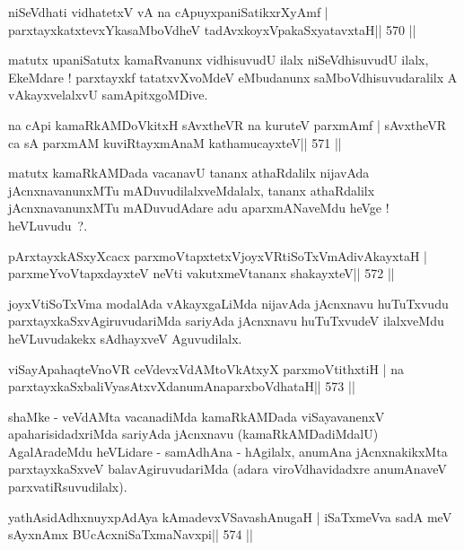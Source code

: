 \begin{shl}
niSeVdhati vidhatetxV vA na cApuyxpaniSatikxrXyAmf |
parxtayxkatxtevxYkasaMboVdheV tadAvxkoyxVpakaSxyatavxtaH\hfill || 570 ||
\end{shl}

\begin{artha}
matutx upaniSatutx kamaRvanunx vidhisuvudU ilalx niSeVdhisuvudU ilalx, EkeMdare ! parxtayxkf tatatxvXvoMdeV eMbudanunx saMboVdhisuvudaralilx A vAkayxvelalxvU samApitxgoMDive.
\end{artha}

\begin{shl}
na cApi kamaRkAMDoVkitxH sAvxtheVR na kuruteV parxmAmf |
sAvxtheVR ca sA parxmAM kuviRtayxmAnaM kathamucayxteV\hfill || 571 ||
\end{shl}

\begin{artha}
matutx kamaRkAMDada vacanavU tananx athaRdalilx nijavAda jAcnxnavanunxMTu mADuvudilalxveMdalalx, tananx athaRdalilx jAcnxnavanunxMTu mADuvudAdare adu aparxmANaveMdu heVge ! heVLuvudu~?.
\end{artha}

\begin{shl}
pArxtayxkASxyXcacx parxmoVtapxtetxVjoyxVRtiSoTxVmAdivAkayxtaH |
parxmeYvoVtapxdayxteV neVti vakutxmeVtananx shakayxteV\hfill || 572 ||
\end{shl}

\begin{artha}
joyxVtiSoTxVma modalAda vAkayxgaLiMda nijavAda jAcnxnavu huTuTxvudu parxtayxkaSxvAgiruvudariMda sariyAda jAcnxnavu huTuTxvudeV ilalxveMdu heVLuvudakekx sAdhayxveV Aguvudilalx.
\end{artha}

\begin{shl}
viSayApahaqteVnoVR ceVdevxVdAMtoVkAtxyX parxmoVtithxtiH |
na parxtayxkaSxbaliVyasAtxvXdanumAnaparxboVdhataH\hfill || 573 ||
\end{shl}

\begin{artha}
shaMke - veVdAMta vacanadiMda kamaRkAMDada viSayavanenxV apaharisidadxriMda sariyAda jAcnxnavu (kamaRkAMDadiMdalU) AgalAradeMdu heVLidare - samAdhAna - hAgilalx, anumAna jAcnxnakikxMta parxtayxkaSxveV balavAgiruvudariMda (adara viroVdhavidadxre anumAnaveV parxvatiRsuvudilalx).
\end{artha}



\begin{shl}
yathAsidAdhxnuyxpAdAya kAmadevxVSavashAnugaH |
iSaTxmeVva sadA meV sAyxnAmx BUcAcxniSaTxmaNavxpi\hfill || 574 ||
\end{shl}

